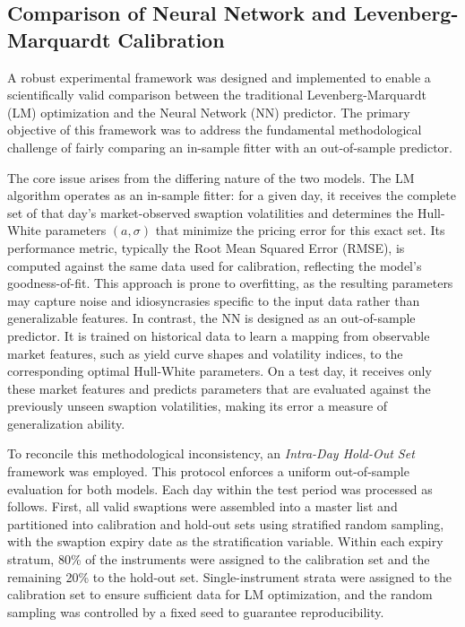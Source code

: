 {\subsection{Comparison of Neural Network and Levenberg-Marquardt Calibration}
\label{subsec:comparison_of_nn_and_lm}
A robust experimental framework was designed and implemented to enable a scientifically valid comparison between the traditional Levenberg-Marquardt (LM) optimization and the Neural Network (NN) predictor. The primary objective of this framework was to address the fundamental methodological challenge of fairly comparing an in-sample fitter with an out-of-sample predictor.  

The core issue arises from the differing nature of the two models. The LM algorithm operates as an in-sample fitter: for a given day, it receives the complete set of that day's market-observed swaption volatilities and determines the Hull-White parameters $(a, \sigma)$ that minimize the pricing error for this exact set. Its performance metric, typically the Root Mean Squared Error (RMSE), is computed against the same data used for calibration, reflecting the model's goodness-of-fit. This approach is prone to overfitting, as the resulting parameters may capture noise and idiosyncrasies specific to the input data rather than generalizable features. In contrast, the NN is designed as an out-of-sample predictor. It is trained on historical data to learn a mapping from observable market features, such as yield curve shapes and volatility indices, to the corresponding optimal Hull-White parameters. On a test day, it receives only these market features and predicts parameters that are evaluated against the previously unseen swaption volatilities, making its error a measure of generalization ability.  

To reconcile this methodological inconsistency, an \emph{Intra-Day Hold-Out Set} framework was employed. This protocol enforces a uniform out-of-sample evaluation for both models. Each day within the test period was processed as follows. First, all valid swaptions were assembled into a master list and partitioned into calibration and hold-out sets using stratified random sampling, with the swaption expiry date as the stratification variable. Within each expiry stratum, 80\% of the instruments were assigned to the calibration set and the remaining 20\% to the hold-out set. Single-instrument strata were assigned to the calibration set to ensure sufficient data for LM optimization, and the random sampling was controlled by a fixed seed to guarantee reproducibility.  

}
